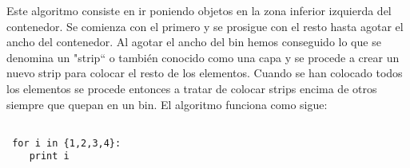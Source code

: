 \documentclass[a4paper,10pt]{article}
\begin{document}
Este algoritmo consiste en ir poniendo objetos en la zona inferior izquierda del contenedor. Se comienza con el primero y se prosigue con 
el resto hasta agotar el ancho del contenedor. Al agotar el ancho del bin hemos conseguido lo que se denomina un "strip`` o también conocido 
como una capa y se procede a crear un nuevo strip para colocar el resto de los elementos. Cuando se han colocado todos los elementos 
se procede entonces a tratar de colocar strips encima de otros siempre que quepan en un bin. El algoritmo funciona como sigue:

\begin{lstlisting}
 
 for i in {1,2,3,4}:
    print i
\end{lstlisting}
\end{document}

